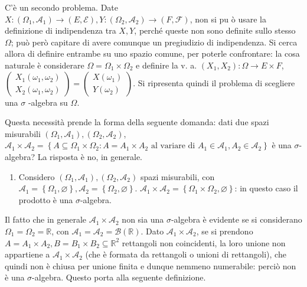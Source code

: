 \documentclass{article}
\begin{document}
C'\`{e} un secondo problema. Date $X:\left( \Omega _{1},\mathcal{A}%
_{1}\right) \rightarrow \left( E,\mathcal{E}\right) ,Y:\left( \Omega _{2},%
\mathcal{A}_{2}\right) \rightarrow \left( F,\mathcal{F}\right) $, non si pu%
\`{o} usare la definizione di indipendenza tra $X,Y$, perch\'{e} queste non
sono definite sullo stesso $\Omega $; pu\`{o} per\`{o} capitare di avere
comunque un pregiudizio di indipendenza. Si cerca allora di definire
entrambe su uno spazio comune, per poterle confrontare: la cosa naturale 
\`{e} considerare $\Omega =\Omega _{1}\times \Omega _{2}$ e definire la v.
a. $\left( X_{1},X_{2}\right) :\Omega \rightarrow E\times F$, $\left( 
\begin{array}{c}
X_{1}\left( \omega _{1},\omega _{2}\right) \\ 
X_{2}\left( \omega _{1},\omega _{2}\right)%
\end{array}%
\right) =\left( 
\begin{array}{c}
X\left( \omega _{1}\right) \\ 
Y\left( \omega _{2}\right)%
\end{array}%
\right) $. Si ripresenta quindi il problema di scegliere una $\sigma $%
-algebra su $\Omega $.

Questa necessit\`{a} prende la forma della seguente domanda: dati due spazi
misurabili $\left( \Omega _{1},\mathcal{A}_{1}\right) ,\left( \Omega _{2},%
\mathcal{A}_{2}\right) $, $\mathcal{A}_{1}\times \mathcal{A}_{2}=\left\{
A\subseteq \Omega _{1}\times \Omega _{2}:A=A_{1}\times A_{2}\text{ al
variare di }A_{1}\in \mathcal{A}_{1},A_{2}\in \mathcal{A}_{2}\right\} $ \`{e}
una $\sigma $-algebra? La risposta \`{e} no, in generale.

\begin{enumerate}
\item Considero $\left( \Omega _{1},\mathcal{A}_{1}\right) ,\left( \Omega
_{2},\mathcal{A}_{2}\right) $ spazi misurabili, con $\mathcal{A}_{1}=\left\{
\Omega _{1},\varnothing \right\} ,\mathcal{A}_{2}=\left\{ \Omega
_{2},\varnothing \right\} $. $\mathcal{A}_{1}\times \mathcal{A}_{2}=\left\{
\Omega _{1}\times \Omega _{2},\varnothing \right\} $: in questo caso il
prodotto \`{e} una $\sigma $-algebra.
\end{enumerate}

Il fatto che in generale $\mathcal{A}_{1}\times \mathcal{A}_{2}$ non sia una 
$\sigma $-algebra \`{e} evidente se si considerano $\Omega _{1}=\Omega _{2}=%
\mathbb{R}
$, con $\mathcal{A}_{1}=\mathcal{A}_{2}=\mathcal{B}\left( 
\mathbb{R}
\right) $. Dato $\mathcal{A}_{1}\times \mathcal{A}_{2}$, se si prendono $%
A=A_{1}\times A_{2},B=B_{1}\times B_{2}\subseteq 
\mathbb{R}
^{2}$ rettangoli non coincidenti, la loro unione non appartiene a $\mathcal{A%
}_{1}\times \mathcal{A}_{2}$ (che \`{e} formata da rettangoli o unioni di
rettangoli), che quindi non \`{e} chiusa per unione finita e dunque nemmeno
numerabile: perci\`{o} non \`{e} una $\sigma $-algebra. Questo porta alla
seguente definizione.
\end{document}
